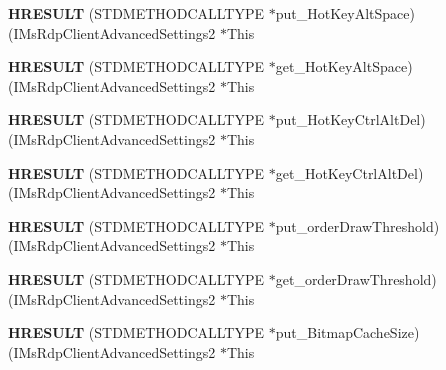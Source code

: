 \begin{DoxyCompactItemize}
{\bfseries H\+R\+E\+S\+U\+LT} (S\+T\+D\+M\+E\+T\+H\+O\+D\+C\+A\+L\+L\+T\+Y\+PE $\ast$put\+\_\+\+Hot\+Key\+Alt\+Space)(I\+Ms\+Rdp\+Client\+Advanced\+Settings2 $\ast$This
\item 
\mbox{\label{struct_i_ms_rdp_client_advanced_settings2_vtbl_a960d9cf58fcb9688ea724f6aae0db9da}} 
{\bfseries H\+R\+E\+S\+U\+LT} (S\+T\+D\+M\+E\+T\+H\+O\+D\+C\+A\+L\+L\+T\+Y\+PE $\ast$get\+\_\+\+Hot\+Key\+Alt\+Space)(I\+Ms\+Rdp\+Client\+Advanced\+Settings2 $\ast$This
\item 
\mbox{\label{struct_i_ms_rdp_client_advanced_settings2_vtbl_ae16f14f10bb1b41cd82cff261e05a742}} 
{\bfseries H\+R\+E\+S\+U\+LT} (S\+T\+D\+M\+E\+T\+H\+O\+D\+C\+A\+L\+L\+T\+Y\+PE $\ast$put\+\_\+\+Hot\+Key\+Ctrl\+Alt\+Del)(I\+Ms\+Rdp\+Client\+Advanced\+Settings2 $\ast$This
\item 
\mbox{\label{struct_i_ms_rdp_client_advanced_settings2_vtbl_a485476780c63d48bf901f189c1fdf69e}} 
{\bfseries H\+R\+E\+S\+U\+LT} (S\+T\+D\+M\+E\+T\+H\+O\+D\+C\+A\+L\+L\+T\+Y\+PE $\ast$get\+\_\+\+Hot\+Key\+Ctrl\+Alt\+Del)(I\+Ms\+Rdp\+Client\+Advanced\+Settings2 $\ast$This
\item 
\mbox{\label{struct_i_ms_rdp_client_advanced_settings2_vtbl_a914e87630316af85cd5e36c2e3233d26}} 
{\bfseries H\+R\+E\+S\+U\+LT} (S\+T\+D\+M\+E\+T\+H\+O\+D\+C\+A\+L\+L\+T\+Y\+PE $\ast$put\+\_\+order\+Draw\+Threshold)(I\+Ms\+Rdp\+Client\+Advanced\+Settings2 $\ast$This
\item 
\mbox{\label{struct_i_ms_rdp_client_advanced_settings2_vtbl_a8cb7b09ff1f9aa66d257f14a188e89a0}} 
{\bfseries H\+R\+E\+S\+U\+LT} (S\+T\+D\+M\+E\+T\+H\+O\+D\+C\+A\+L\+L\+T\+Y\+PE $\ast$get\+\_\+order\+Draw\+Threshold)(I\+Ms\+Rdp\+Client\+Advanced\+Settings2 $\ast$This
\item 
\mbox{\label{struct_i_ms_rdp_client_advanced_settings2_vtbl_a92f202542ab6ab3ba2451a9fa5c5600e}} 
{\bfseries H\+R\+E\+S\+U\+LT} (S\+T\+D\+M\+E\+T\+H\+O\+D\+C\+A\+L\+L\+T\+Y\+PE $\ast$put\+\_\+\+Bitmap\+Cache\+Size)(I\+Ms\+Rdp\+Client\+Advanced\+Settings2 $\ast$This

\end{DoxyCompactItemize}
